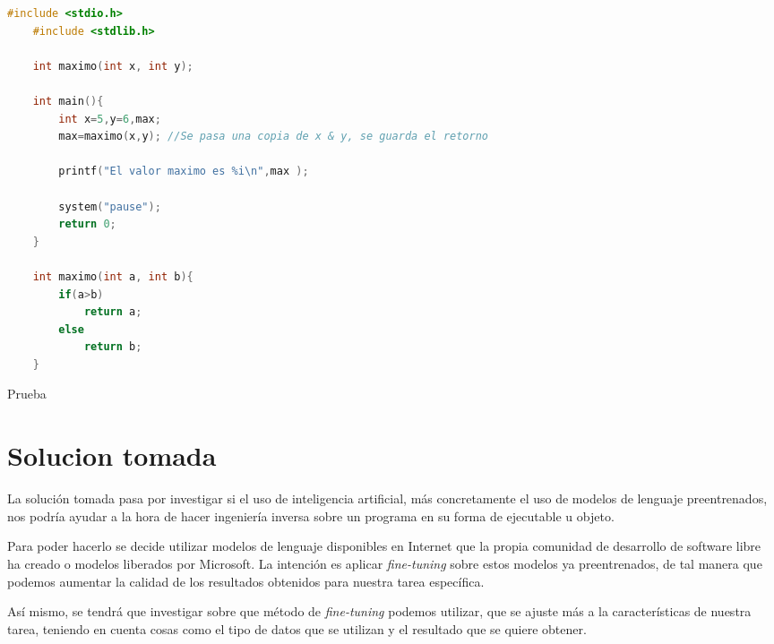 \begin{code}[h]
    \begin{lstlisting}[language=C++]
    #include <stdio.h>
    #include <stdlib.h>

    int maximo(int x, int y);

    int main(){
        int x=5,y=6,max;
        max=maximo(x,y); //Se pasa una copia de x & y, se guarda el retorno

        printf("El valor maximo es %i\n",max );

        system("pause");
        return 0;
    }

    int maximo(int a, int b){
        if(a>b)
            return a;
        else
            return b;
    }
    \end{lstlisting}
    \caption[Prueba 2]{Prueba}
    \label{cod:codejemplo}
\end{code}
    

\section{Solucion tomada}
\label{sec:solucion}


La solución tomada pasa por investigar si el uso de inteligencia artificial, más concretamente el uso de modelos de lenguaje preentrenados, nos podría ayudar a la hora de hacer
ingeniería inversa sobre un programa en su forma de ejecutable u objeto.

Para poder hacerlo se decide utilizar modelos de lenguaje disponibles en Internet que la propia comunidad de desarrollo de software libre ha creado o modelos liberados por Microsoft.
La intención es aplicar \textit{fine-tuning} sobre estos modelos ya preentrenados, de tal manera que podemos aumentar la calidad de los resultados obtenidos para nuestra
tarea específica.

Así mismo, se tendrá que investigar sobre que método de \textit{fine-tuning} podemos utilizar, que se ajuste más a la características de nuestra tarea, teniendo en cuenta cosas como el
tipo de datos que se utilizan y el resultado que se quiere obtener.
